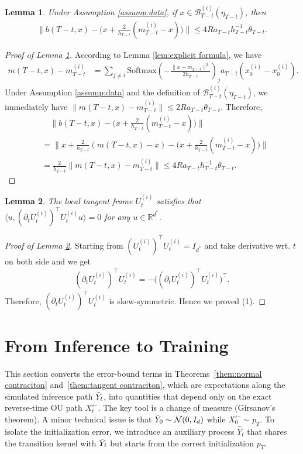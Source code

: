 \documentclass[11pt]{article}
\newcommand{\mb}{\mathbb}
\newcommand{\mc}{\mathcal}
\newcommand{\Softmax}{\mathrm{Softmax}}
\newtheorem{lemma}{Lemma}[section]
\begin{document}
\begin{lemma}\label{lem:application closeness} Under Assumption \ref{assump:data}, if $x\in \mc{B}_{T-t}^{(i)}(\eta_{T-t})$, then
    \begin{align*}
        \| b(T-t,x) - \big( x + \frac{2}{h_{T-t}}( m_{T-t}^{(i)} -x ) \big) \| \le 4R a_{T-t}h_{T-t}^{-1} \theta_{T-t}.
    \end{align*}
\end{lemma} 
\begin{proof}[Proof of Lemma \ref{lem:application closeness}] According to Lemma \ref{lem:explicit formula}, we have
\begin{align*}
    m(T-t,x) - m_{T-t}^{(i)} & =\sum_{j\neq i} \Softmax(-\frac{\| x-m_{T-t} \|^2}{2h_{T-t}})_j a_{T-t}(x_0^{(i)}-x_0^{(i)}) .
\end{align*}
Under Assumption \ref{assump:data} and the definition of $\mc{B}_{T-t}^{(i)}(\eta_{T-t})$, we immediately have $\| m(T-t,x) - m_{T-t}^{(i)} \|\le 2Ra_{T-t}\theta_{T-t}$. Therefore,
\begin{align*}
     &\quad\| b(T-t,x) - \big( x + \frac{2}{h_{T-t}}( m_{T-t}^{(i)} -x ) \big) \| \\
     & = \| x + \frac{2}{h_{T-t}}(m(T-t,x)-x) - \big( x + \frac{2}{h_{T-t}}( m_{T-t}^{(i)} -x )\big) \| \\
    & = \frac{2}{h_{T-t}}\| m(T-t,x) - m_{T-t}^{(i)} \|  \le 4R a_{T-t}h_{T-t}^{-1} \theta_{T-t}.
\end{align*}
\end{proof}
\begin{lemma}\label{lem:property local frame} The local tangent frame $U_t^{(i)}$ satisfies that $\langle u,  (\partial_t U_t^{(i)})^\intercal U_t^{(i)} u \rangle=0$ for any $u\in \mb{R}^{d^*}$.
\end{lemma}
\begin{proof}[Proof of Lemma \ref{lem:property local frame}] Starting from $(U_t^{(i)})^\intercal U_t^{(i)} = I_{d^*}$ and take derivative wrt. $t$ on both side and we get
    \begin{align*}
      (\partial_t U_t^{(i)})^\intercal U_t^{(i)}  = - \big(  (\partial_t U_t^{(i)})^\intercal U_t^{(i)} \big)^\intercal.
    \end{align*}
    Therefore, $ (\partial_t U_t^{(i)})^\intercal U_t^{(i)}$ is skew-symmetric. Hence we proved (1).
\end{proof}
\section{From Inference to Training}\label{append:from inference to training} This section converts the error-bound terms in Theorems~\ref{them:normal contraciton} and~\ref{them:tangent contraciton}, which are expectations along the simulated inference path $\Tilde{Y}_t$, into quantities that depend only on the exact reverse-time OU path $X_t^\leftarrow$. The key tool is a change of measure (Girsanov's theorem). A minor technical issue is that $\Tilde{Y}_0\sim \mc{N}(0,I_d)$ while $X_0^\leftarrow\sim p_T$. To isolate the initialization error, we introduce an auxiliary process $\hat{Y}_t$ that shares the transition kernel with $\Tilde{Y}_t$ but starts from the correct initialization $p_T$.  
\end{document}
